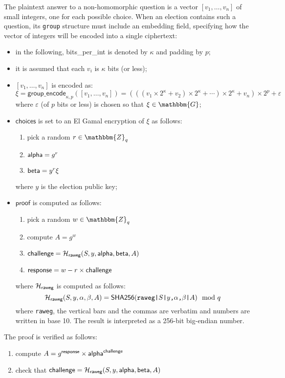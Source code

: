 \documentclass[a4paper]{article}
\newcommand{\G}{\mathbbm{G}}
\newcommand{\Z}{\mathbbm{Z}}
\newcommand{\shatwo}{\textsf{SHA256}}
\begin{document}
The plaintext answer to a non-homomorphic question is a vector
$[v_1,\dots,v_n]$ of small integers, one for each possible
choice. When an election contains such a question, its \texttt{group}
structure must include an \textsf{embedding} field, specifying how the
vector of integers will be encoded into a single ciphertext:
\begin{itemize}
\item in the following, \textsf{bits\_per\_int} is denoted by $\kappa$
  and \textsf{padding} by $p$;
\item it is assumed that each $v_i$ is $\kappa$ bits (or less);
\item $[v_1,\dots,v_n]$ is encoded as:
  \[
    \xi=\textsf{group\_encode}_{\kappa,p}([v_1,\dots,v_n])=(((v_1\times
    2^\kappa+v_2)\times 2^\kappa+\dotsb)\times 2^\kappa+v_n)\times
    2^p+\varepsilon
  \]
  where $\varepsilon$ (of $p$ bits or less) is chosen so that $\xi\in\G$;
\item $\textsf{choices}$ is set to an El Gamal encryption of $\xi$ as
  follows:
  \begin{enumerate}
  \item pick a random $r\in\Z_q$
  \item $\textsf{alpha}=g^r$
  \item $\textsf{beta}=y^r\xi$
  \end{enumerate}
  where $y$ is the election public key;
\item $\textsf{proof}$ is computed as follows:
  \begin{enumerate}
  \item pick a random $w\in\Z_q$
  \item compute $A=g^w$
  \item $\textsf{challenge}=\mathcal{H}_{\textsf{raweg}}(S,y,\textsf{alpha},\textsf{beta},A)$
  \item $\textsf{response}=w-r\times\textsf{challenge}$
  \end{enumerate}
  where $\mathcal{H}_{\textsf{raweg}}$ is computed as follows:
  \[
    \Hash_{\textsf{raweg}}(S,y,\alpha,\beta,A)=\shatwo(\verb=raweg|=S\verb=|=y\verb=,=\alpha\verb=,=\beta\verb=|=A)\mod q
  \]
  where \verb=raweg=, the vertical bars and the commas are verbatim and
  numbers are written in base 10. The result is interpreted as a 256-bit
  big-endian number.
\end{itemize}
The proof is verified as follows:
\begin{enumerate}
\item compute $A=g^{\textsf{response}}\times\textsf{alpha}^{\textsf{challenge}}$
\item check that $\textsf{challenge}=\mathcal{H}_{\textsf{raweg}}(S,y,\textsf{alpha},\textsf{beta},A)$
\end{enumerate}
\end{document}
